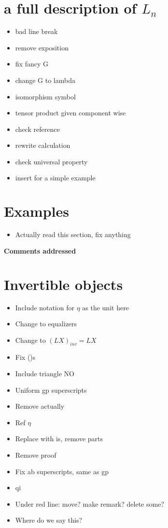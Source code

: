 \documentclass{amsart}
\begin{document}
\section{a full description of $L_n $}
\begin{itemize}
\item bad line break
\item remove exposition
\item fix fancy G
\item change G to lambda
\item isomorphism symbol
\item tensor product given component wise
\item check reference
\item rewrite calculation
\item check universal property
\item insert for a simple example
\end{itemize}
\section{ Examples}
\begin{itemize}
\item Actually read this section, fix anything
\end{itemize}
\newpage

\begin{center}
\begin{Large}
\textbf{Comments addressed}
\end{Large}
\end{center}
\vskip1cm


\section{ Invertible objects}
\begin{itemize}
\item Include notation for $\eta$ as the unit here
\item Change to equalizers
\item Change to $(LX)_{inv} = LX$
\item Fix ()s
\item Include triangle NO
\item Uniform gp superscripts
\item Remove actually
\item Ref $\eta$
\item Replace with is, remove parts
\item Remove proof
\item Fix ab superscripts, same as gp
\item qi
\item Under red line: move? make remark? delete some?
\item Where do we say this?
\end{itemize}
\end{document}
